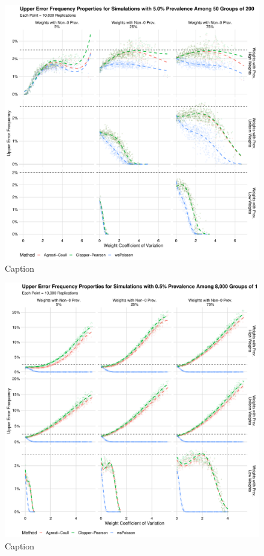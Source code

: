 \documentclass[AMA,STIX1COL]{WileyNJD-v2}
\begin{document}
\begin{figure}
\centering
\includegraphics[width=\textwidth]{figures/perfect_upper_error_frequency_50_groups_0_05_prev.pdf}
\caption{Caption}
\label{fig:perfect_upper_error_frequency_50_groups_0_05_prev}
\end{figure}

\begin{figure}
\centering
\includegraphics[width=\textwidth]{figures/perfect_upper_error_frequency_8000_groups_0_005_prev.pdf}
\caption{Caption}
\label{fig:perfect_upper_error_frequency_8000_groups_0_005_prev}
\end{figure}
\end{document}
